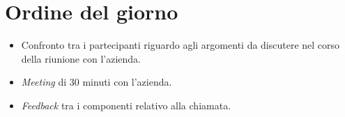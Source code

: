 \section{Ordine del giorno}
\begin{itemize}
    \item Confronto tra i partecipanti riguardo agli argomenti da discutere nel 
		corso della riunione con l'azienda.
    \item \textit{Meeting} di 30 minuti con l'azienda.
    \item \textit{Feedback} tra i componenti relativo alla chiamata.
\end{itemize}
